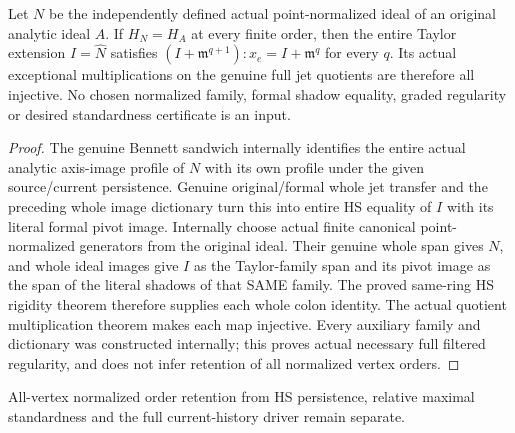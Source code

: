 \begin{theorem}
\label{hir:actual-original-point-persistent-hs-full-initial-colons}
\leanok
Let $N$ be the independently defined actual point-normalized ideal of
an original analytic ideal $A$. If $H_N=H_A$ at every finite order,
then the entire Taylor extension $I=\widehat N$ satisfies
$(I+\mathfrak m^{q+1}):x_e=I+\mathfrak m^q$ for every $q$.
Its actual exceptional multiplications on the genuine full jet
quotients are therefore all injective. No chosen normalized family,
formal shadow equality, graded regularity or desired standardness
certificate is an input.
\end{theorem}
\begin{proof}
The genuine Bennett sandwich internally identifies the entire actual
analytic axis-image profile of $N$ with its own profile under the
given source/current persistence. Genuine original/formal whole jet
transfer and the preceding whole image dictionary turn this into
entire HS equality of $I$ with its literal formal pivot image.
Internally choose actual finite canonical point-normalized generators
from the original ideal. Their genuine whole span gives $N$, and
whole ideal images give $I$ as the Taylor-family span and its pivot
image as the span of the literal shadows of that SAME family.
The proved same-ring HS rigidity theorem therefore supplies each
whole colon identity. The actual quotient multiplication theorem
makes each map injective. Every auxiliary family and dictionary was
constructed internally; this proves actual necessary full filtered
regularity, and does not infer retention of all normalized vertex orders.
\end{proof}

All-vertex normalized order retention from HS persistence, relative
maximal standardness and the full current-history driver remain separate.
